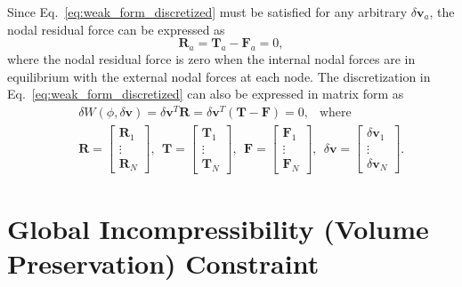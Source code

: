 \documentclass[12pt,aps,pre]{revtex4}
\begin{document}
Since Eq.\ \eqref{eq:weak_form_discretized} must be satisfied for any arbitrary $\delta \pmb{v}_a$, the nodal residual force can be expressed as
%
\begin{equation}
\pmb{R}_a = \pmb{T}_a - \pmb{F}_a = 0,
\end{equation}
%
where the nodal residual force is zero when the internal nodal forces are in equilibrium with the external nodal forces at each node. The discretization in Eq.\ \eqref{eq:weak_form_discretized} can also be expressed in matrix form as
%
\begin{eqnarray}
&&\delta W(\phi,\delta\pmb{v}) = \delta \textbf{v}^T \textbf{R} = \delta \textbf{v}^T (\textbf{T} - \textbf{F})=0, \ \ \text{ where } \nonumber\\
%
&& \textbf{R} = \begin{bmatrix}
\pmb{R}_1 \\ \vdots \\ \pmb{R}_N
\end{bmatrix}, \ \
%
\textbf{T} = \begin{bmatrix}
\pmb{T}_1 \\ \vdots \\ \pmb{T}_N
\end{bmatrix}, \ \
%
\textbf{F} = \begin{bmatrix}
\pmb{F}_1 \\ \vdots \\ \pmb{F}_N
\end{bmatrix}, \ \
%
\delta\textbf{v} = \begin{bmatrix}
\delta\pmb{v}_1 \\ \vdots \\ \delta\pmb{v}_N
\end{bmatrix}.
\end{eqnarray}
%

\section{Global Incompressibility (Volume Preservation) Constraint}
\end{document}
